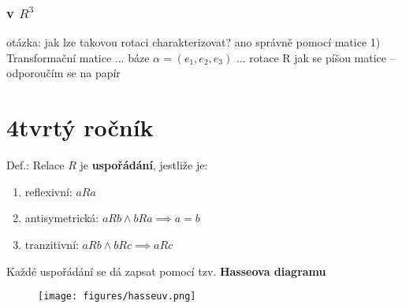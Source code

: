 \documentclass{article}
\begin{document}
\section{v $R^3$}
otázka: jak lze takovou rotaci charakterizovat? ano správně pomocí matice
1) Transformační matice
... báze $\alpha = (e_1, e_2, e_3)$
... rotace R
jak se píšou matice -- odporoučím se na papír

\part{4tvrtý ročník}

Def.: Relace $R$ je \textbf{uspořádání}, jestliže je: 
\begin{enumerate}
  \item reflexivní: $aRa$
  \item antisymetrická: $aRb  \land bRa \implies a = b$ 
  \item tranzitivní: $aRb \land bRc \implies aRc$ 
\end{enumerate}

Každé uspořádání se dá zapsat pomocí tzv. \textbf{Hasseova diagramu} 

\begin{figure}
  \begin{center}
    \texttt{[image: figures/hasseuv.png]}
  \end{center}
\end{figure}
\end{document}
